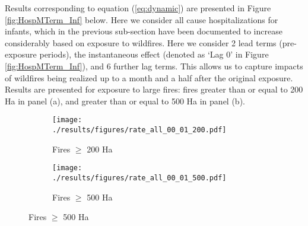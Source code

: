 \documentclass[11pt]{article}
\begin{document}
\begin{spacing}{1.5}
Results corresponding to equation (\ref{eq:dynamic}) are presented in Figure \ref{fig:HospMTerm_Inf} below.  Here we consider all cause hospitalizations for infants, which in the previous sub-section have been documented to increase considerably based on exposure to wildfires.  Here we consider 2 lead terms (pre-exposure periods), the instantaneous effect (denoted as `Lag 0' in Figure \ref{fig:HospMTerm_Inf}), and 6 further lag terms.  This allows us to capture impacts of wildfires being realized up to a month and a half after the original exposure.   Results are presented for exposure to large fires: fires greater than or equal to 200 Ha in panel (a), and greater than or equal to 500 Ha in panel (b). 


\begin{figure}[htpb!]
    \caption{Dynamic Impacts of Upwind Wildfires on Infants' Hospitalizations for All Causes}   
    \label{fig:HospMTerm_Inf}
    \begin{subfigure}{0.49\textwidth}
    \centering
    \texttt{[image: ./results/figures/rate\_all\_00\_01\_200.pdf]}
    \caption{Fires $\geq$ 200 Ha}
    \end{subfigure}    
    \begin{subfigure}{0.49\textwidth}
    \centering
     \texttt{[image: ./results/figures/rate\_all\_00\_01\_500.pdf]}
     \caption{Fires $\geq$ 500 Ha}
     \end{subfigure}    
\end{figure}


\end{spacing}
\end{document}
